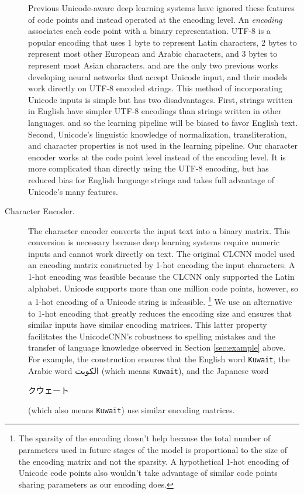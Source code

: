 \documentclass[sigconf,anonymous,review]{acmart}
\newcommand{\str}[1]{\texttt{#1}}
\newcommand{\defn}[1]{\textit{#1}}
\begin{document}
\begin{description}
Previous Unicode-aware deep learning systems have ignored these features of code points and instead operated at the encoding level.
An \defn{encoding} associates each code point with a binary representation. 
UTF-8 is a popular encoding that uses 1 byte to represent Latin characters,
2 bytes to represent most other European and Arabic characters,
and 3 bytes to represent most Asian characters.
\citet{gillick2015multilingual} and \citet{plank2016multilingual} are the only two previous works developing neural networks that accept Unicode input,
and their models work directly on UTF-8 encoded strings.
This method of incorporating Unicode inputs is simple but has two disadvantages.
First, strings written in English have simpler UTF-8 encodings than strings written in other languages.
and so the learning pipeline will be biased to favor English text.
Second, Unicode's linguistic knowledge of normalization, transliteration, and character properties is not used in the learning pipeline.
Our character encoder works at the code point level instead of the encoding level.
It is more complicated than directly using the UTF-8 encoding,
but has reduced bias for English language strings and takes full advantage of Unicode's many features.

\item[Character Encoder.]
The character encoder converts the input text into a binary matrix.
This conversion is necessary because deep learning systems require numeric inputs and cannot work directly on text.
The original CLCNN model used an encoding matrix constructed by 1-hot encoding the input characters.
A 1-hot encoding was feasible because the CLCNN only supported the Latin alphabet.
Unicode supports more than one million code points,
however,
so a 1-hot encoding of a Unicode string is infeasible.%
\footnote{
The sparsity of the encoding doesn't help because the total number of parameters used in future stages of the model is proportional to the size of the encoding matrix and not the sparsity.
A hypothetical 1-hot encoding of Unicode code points also wouldn't take advantage of similar code points sharing parameters as our encoding does.
}
We use an alternative to 1-hot encoding that greatly reduces the encoding size and
ensures that similar inputs have similar encoding matrices.
This latter property facilitates the UnicodeCNN's robustness to spelling mistakes and the transfer of language knowledge observed in Section \ref{sec:example} above.
For example, the construction ensures that the English word \str{Kuwait}, 
the Arabic word \foreignlanguage{arabic}{الكويت} (which means \str{Kuwait}), 
and the Japanese word \begin{CJK}{UTF8}{min}クウェート\end{CJK} (which also means \str{Kuwait})
use similar encoding matrices.


\end{description}
\end{document}
